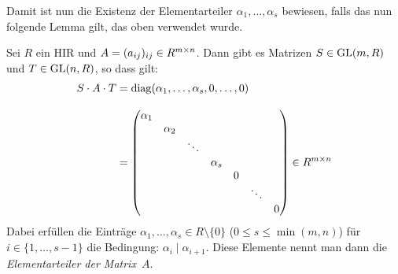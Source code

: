 Damit ist nun die Existenz der Elementarteiler $\alpha_1,\ldots,\alpha_s$
bewiesen, falls das nun folgende Lemma gilt, das oben verwendet wurde.

\begin{thLemma}\label{ets:matrix}
    Sei $R$ ein HIR und $A = (a_{ij})_{ij} \in R^{m\times n}$. Dann gibt es
    Matrizen $S\in\mathrm{GL}(m,R)$ und $T\in\mathrm{GL}(n,R)$, so dass gilt:
    \begin{align*}
        S\cdot A\cdot T 
        &= \mathrm{diag}(\alpha_1,\ldots,\alpha_s,0,\ldots,0)
        \\[3mm]
        &= \begin{pmatrix} 
        \alpha_1 & & & & & &   \\ 
        & \alpha_2 & & & & &   \\
        & & \ddots & & & &     \\
        & & & \alpha_s & & &   \\
        & & & & 0 & &          \\
        & & & & & \ddots &     \\
        & & & & & & 0         
         \end{pmatrix}
        \in R^{m\times n}
    \end{align*}
    Dabei erfüllen die Einträge $\alpha_1,\ldots,\alpha_s\in R\setminus\{0\}$
    ($0\leq s\leq \min(m,n)$) für $i\in\{1,\ldots,s-1\}$ die Bedingung:
    $\alpha_i \mid \alpha_{i+1}$. Diese Elemente nennt man dann die
    \emph{Elementarteiler der Matrix~$A$}.
\end{thLemma}

